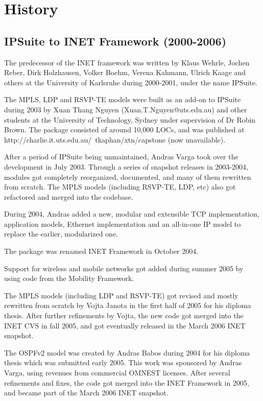 \chapter{History}
\label{cha:History}

\section{IPSuite to INET Framework (2000-2006)}

The predecessor of the INET framework was written by Klaus
Wehrle, Jochen Reber, Dirk Holzhausen, Volker Boehm, Verena Kahmann,
Ulrich Kaage and others at the University of Karlsruhe during 2000-2001,
under the name IPSuite.

The MPLS, LDP and RSVP-TE models were built as an add-on to IPSuite
during 2003 by Xuan Thang Nguyen (Xuan.T.Nguyen@uts.edu.au) and other
students at the University of Technology, Sydney under supervision of
Dr Robin Brown. The package consisted of around 10,000 LOCs, and was
published at http://charlie.it.uts.edu.au/~tkaphan/xtn/capstone (now
unavailable).

After a period of IPSuite being unmaintained, Andras Varga took over
the development in July 2003. Through a series of snapshot releases in
2003-2004, modules got completely reorganized, documented, and many of them
rewritten from scratch. The MPLS models (including RSVP-TE, LDP, etc)
also got refactored and merged into the codebase.

During 2004, Andras added a new, modular and extensible TCP implementation,
application models, Ethernet implementation and an all-in-one IP model
to replace the earlier, modularized one.

The package was renamed INET Framework in October 2004.

Support for wireless and mobile networks got added during summer 2005
by using code from the Mobility Framework.

The MPLS models (including LDP and RSVP-TE) got revised and mostly
rewritten from scratch by Vojta Janota in the first half of 2005
for his diploma thesis. After further refinements by Vojta, the new code
got merged into the INET CVS in fall 2005, and got eventually released
in the March 2006 INET snapshot.

The OSPFv2 model was created by Andras Babos during 2004 for his diploma
thesis which was submitted early 2005. This work was sponsored by Andras Varga,
using revenues from commercial OMNEST licenses. After several refinements and fixes,
the code got merged into the INET Framework in 2005, and became part of the
March 2006 INET snapshot.

